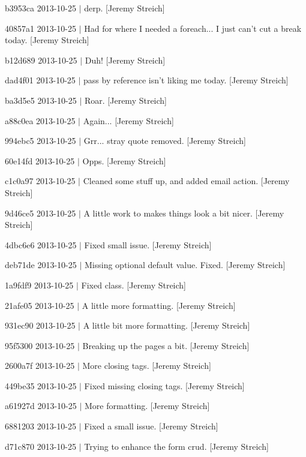 \begin{DoxyItemize}
\item b3953ca 2013-\/10-\/25 $|$ derp. \mbox{[}Jeremy Streich\mbox{]}
\item 40857a1 2013-\/10-\/25 $|$ Had for where I needed a foreach... I just can't cut a break today. \mbox{[}Jeremy Streich\mbox{]}
\item b12d689 2013-\/10-\/25 $|$ Duh! \mbox{[}Jeremy Streich\mbox{]}
\item dad4f01 2013-\/10-\/25 $|$ pass by reference isn't liking me today. \mbox{[}Jeremy Streich\mbox{]}
\item ba3d5e5 2013-\/10-\/25 $|$ Roar. \mbox{[}Jeremy Streich\mbox{]}
\item a88c0ea 2013-\/10-\/25 $|$ Again... \mbox{[}Jeremy Streich\mbox{]}
\item 994ebc5 2013-\/10-\/25 $|$ Grr... stray quote removed. \mbox{[}Jeremy Streich\mbox{]}
\item 60e14fd 2013-\/10-\/25 $|$ Opps. \mbox{[}Jeremy Streich\mbox{]}
\item c1c0a97 2013-\/10-\/25 $|$ Cleaned some stuff up, and added email action. \mbox{[}Jeremy Streich\mbox{]}
\item 9d46ce5 2013-\/10-\/25 $|$ A little work to makes things look a bit nicer. \mbox{[}Jeremy Streich\mbox{]}
\item 4dbc6e6 2013-\/10-\/25 $|$ Fixed small issue. \mbox{[}Jeremy Streich\mbox{]}
\item deb71de 2013-\/10-\/25 $|$ Missing optional default value. Fixed. \mbox{[}Jeremy Streich\mbox{]}
\item 1a9fdf9 2013-\/10-\/25 $|$ Fixed class. \mbox{[}Jeremy Streich\mbox{]}
\item 21afe05 2013-\/10-\/25 $|$ A little more formatting. \mbox{[}Jeremy Streich\mbox{]}
\item 931ec90 2013-\/10-\/25 $|$ A little bit more formatting. \mbox{[}Jeremy Streich\mbox{]}
\item 95f5300 2013-\/10-\/25 $|$ Breaking up the pages a bit. \mbox{[}Jeremy Streich\mbox{]}
\item 2600a7f 2013-\/10-\/25 $|$ More closing tags. \mbox{[}Jeremy Streich\mbox{]}
\item 449be35 2013-\/10-\/25 $|$ Fixed missing closing tags. \mbox{[}Jeremy Streich\mbox{]}
\item a61927d 2013-\/10-\/25 $|$ More formatting. \mbox{[}Jeremy Streich\mbox{]}
\item 6881203 2013-\/10-\/25 $|$ Fixed a small issue. \mbox{[}Jeremy Streich\mbox{]}
\item d71c870 2013-\/10-\/25 $|$ Trying to enhance the form crud. \mbox{[}Jeremy Streich\mbox{]}

\end{DoxyItemize}
